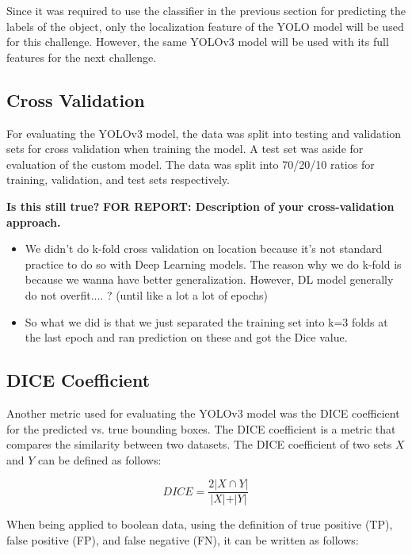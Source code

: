 \documentclass[12pt]{article}
\begin{document}
Since it was required to use the classifier in the previous section for predicting the labels of the object, only the localization feature of the YOLO model will be used for this challenge. However, the same YOLOv3 model will be used with its full features for the next challenge.

\subsection{Cross Validation}

For evaluating the YOLOv3 model, the data was split into testing and validation sets for cross validation when training the model. A test set was aside for evaluation of the custom model. The data was split into 70/20/10 ratios for training, validation, and test sets respectively.

\textbf{Is this still true?}
\textbf{FOR REPORT: Description of your cross-validation approach.}

\begin{itemize}
    \item We didn't do k-fold cross validation on location because it's not standard practice to do so with Deep Learning models. The reason why we do k-fold is because we wanna have better generalization. However, DL model generally do not overfit.... ? (until like a lot a lot of epochs) 
    \item So what we did is that we just separated the training set into k=3 folds at the last epoch and ran prediction on these and got the Dice value. 
\end{itemize}

\subsection{DICE Coefficient}

Another metric used for evaluating the YOLOv3 model was the DICE coefficient for the predicted vs. true bounding boxes. The DICE coefficient is a metric that compares the similarity between two datasets. The DICE coefficient of two sets $X$ and $Y$ can be defined as follows:  

\begin{equation}
    DICE = \frac{2 \rvert X \cap Y \rvert} 
            {\rvert X \rvert + \rvert Y \rvert} 
\end{equation}

When being applied to boolean data, using the definition of true positive (TP), false positive (FP), and false negative (FN), it can be written as follows:
\end{document}
